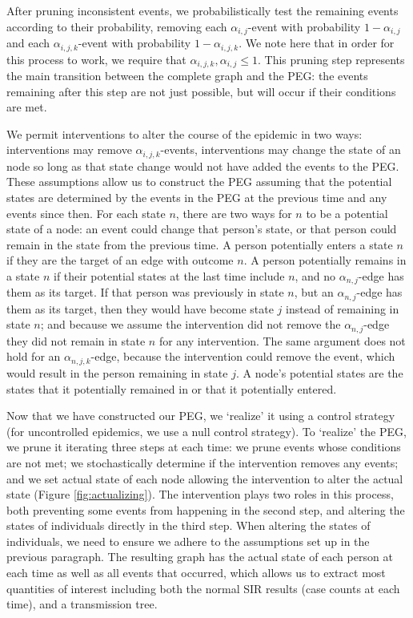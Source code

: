 \documentclass[PTRSB]{rsos}
\begin{document}
\begin{multicols}{2}
After pruning inconsistent events, we probabilistically test the remaining events according to their probability, removing each $\alpha_{i,j}$-event with probability $1-\alpha_{i,j}$ and each $\alpha_{i,j,k}$-event with probability $1-\alpha_{i,j,k}$.
We note here that in order for this process to work, we require that $\alpha_{i,j,k},\alpha_{i,j} \leq 1$.
This pruning step represents the main transition between the complete graph and the PEG: the events remaining after this step are not just possible, but will occur if their conditions are met.

We permit interventions to alter the course of the epidemic in two ways: interventions may remove $\alpha_{i,j,k}$-events, interventions may change the state of an node so long as that state change would not have added the events to the PEG.
These assumptions allow us to construct the PEG assuming that the potential states are determined by the events in the PEG at the previous time and any events since then.
For each state $n$, there are two ways for $n$ to be a potential state of a node: an event could change that person's state, or that person could remain in the state from the previous time.
A person potentially enters a state $n$ if they are the target of an edge with outcome $n$.
A person potentially remains in a state $n$ if their potential states at the last time include $n$, and no $\alpha_{n,j}$-edge has them as its target.
If that person was previously in state $n$, but an $\alpha_{n,j}$-edge has them as its target, then they would have become state $j$ instead of remaining in state $n$; and because we assume the intervention did not remove the $\alpha_{n,j}$-edge they did not remain in state $n$ for any intervention.
The same argument does not hold for an $\alpha_{n,j,k}$-edge, because the intervention could remove the event, which would result in the person remaining in state $j$.
A node's potential states are the states that it potentially remained in or that it potentially entered.

Now that we have constructed our PEG, we `realize' it using a control strategy (for uncontrolled epidemics, we use a null control strategy).
To `realize' the PEG, we prune it iterating three steps at each time: we prune events whose conditions are not met; we stochastically determine if the intervention removes any events; and we set actual state of each node allowing the intervention to alter the actual state (Figure \ref{fig:actualizing}).
The intervention plays two roles in this process, both preventing some events from happening in the second step, and altering the states of individuals directly in the third step.
When altering the states of individuals, we need to ensure we adhere to the assumptions set up in the previous paragraph.
The resulting graph has the actual state of each person at each time as well as all events that occurred, which allows us to extract most quantities of interest including both the normal SIR results (case counts at each time), and a transmission tree.


\end{multicols}
\end{document}
